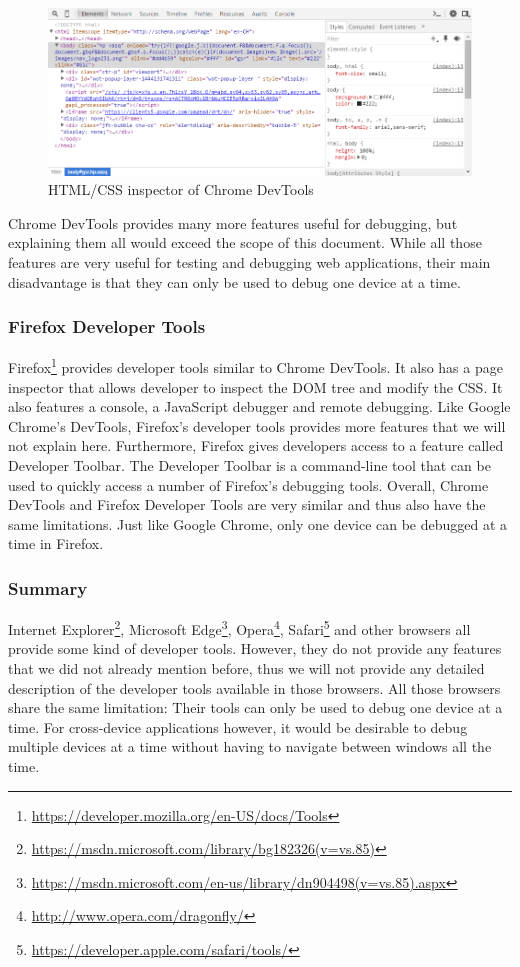 \begin{figure}[H]
  \centering
    \includegraphics[width=1.0\textwidth]{images/relatedwork/chrome_devtools_3.png}
	\caption[Screenshot: Chrome DevTools]{HTML/CSS inspector of Chrome DevTools}
	\label{fig:chrome_devtools}
\end{figure}

Chrome DevTools provides many more features useful for debugging, but explaining them all would exceed the scope of this document. While all those features are very useful for testing and debugging web applications, their main disadvantage is that they can only be used to debug one device at a time.

\subsubsection{Firefox Developer Tools}

Firefox\footnote{\url{https://developer.mozilla.org/en-US/docs/Tools}} provides developer tools similar to Chrome DevTools. It also has a page inspector that allows developer to inspect the DOM tree and modify the CSS. It also features a console, a JavaScript debugger and remote debugging. Like Google Chrome's DevTools, Firefox's developer tools provides more features that we will not explain here. Furthermore, Firefox gives developers access to a feature called Developer Toolbar. The Developer Toolbar is a command-line tool that can be used to quickly access a number of Firefox's debugging tools. Overall, Chrome DevTools and Firefox Developer Tools are very similar and thus also have the same limitations. Just like Google Chrome, only one device can be debugged at a time in Firefox.

\subsubsection{Summary}

Internet Explorer\footnote{\url{https://msdn.microsoft.com/library/bg182326(v=vs.85)}}, Microsoft Edge\footnote{\url{https://msdn.microsoft.com/en-us/library/dn904498(v=vs.85).aspx}}, Opera\footnote{\url{http://www.opera.com/dragonfly/}}, Safari\footnote{\url{https://developer.apple.com/safari/tools/}} and other browsers all provide some kind of developer tools. However, they do not provide any features that we did not already mention before, thus we will not provide any detailed description of the developer tools available in those browsers. All those browsers share the same limitation: Their tools can only be used to debug one device at a time. For cross-device applications however, it would be desirable to debug multiple devices at a time without having to navigate between windows all the time.

